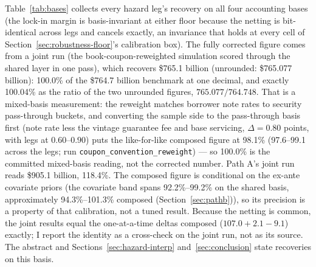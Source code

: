 \documentclass[12pt]{article}
\begin{document}
Table~\ref{tab:bases} collects every hazard leg's recovery on all four accounting bases (the lock-in margin is basis-invariant at either floor because the netting is bit-identical across legs and cancels exactly, an invariance that holds at every cell of Section~\ref{sec:robustness-floor}'s calibration box). The fully corrected figure comes from a joint run (the book-coupon-reweighted simulation scored through the shared layer in one pass), which recovers \$765.1 billion (unrounded: \$765.077 billion): 100.0\% of the \$764.7 billion benchmark at one decimal, and exactly 100.04\% as the ratio of the two unrounded figures, $765.077/764.748$. That is a mixed-basis measurement: the reweight matches borrower note rates to security pass-through buckets, and converting the sample side to the pass-through basis first (note rate less the vintage guarantee fee and base servicing, $\Delta = 0.80$ points, with legs at $0.60$--$0.90$) puts the like-for-like composed figure at 98.1\% (97.6--99.1 across the legs; run \texttt{coupon\_convention\_reweight}) --- so 100.0\% is the committed mixed-basis reading, not the corrected number. Path A's joint run reads \$905.1 billion, 118.4\%. The composed figure is conditional on the ex-ante covariate priors (the covariate band spans 92.2\%--99.2\% on the shared basis, approximately 94.3\%--101.3\% composed (Section~\ref{sec:pathb})), so its precision is a property of that calibration, not a tuned result. Because the netting is common, the joint results equal the one-at-a-time deltas composed ($107.0 + 2.1 - 9.1$) exactly; I report the identity as a cross-check on the joint run, not as its source. The abstract and Sections~\ref{sec:hazard-interp} and~\ref{sec:conclusion} state recoveries on this basis.
\end{document}
